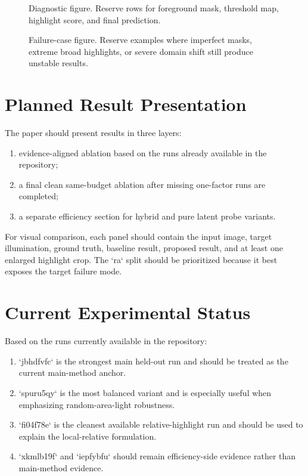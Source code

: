\documentclass[UTF8,a4paper]{ctexart}
\begin{document}
\begin{figure}[htbp]
\centering
\fbox{\rule{0pt}{4.6cm}\rule{0.92\linewidth}{0pt}}
\caption{Diagnostic figure. Reserve rows for foreground mask, threshold map, highlight score, and final prediction.}
\end{figure}

\begin{figure}[htbp]
\centering
\fbox{\rule{0pt}{4.5cm}\rule{0.92\linewidth}{0pt}}
\caption{Failure-case figure. Reserve examples where imperfect masks, extreme broad highlights, or severe domain shift still produce unstable results.}
\end{figure}

\section{Planned Result Presentation}

The paper should present results in three layers:

\begin{enumerate}
\item evidence-aligned ablation based on the runs already available in the repository;
\item a final clean same-budget ablation after missing one-factor runs are completed;
\item a separate efficiency section for hybrid and pure latent probe variants.
\end{enumerate}

For visual comparison, each panel should contain the input image, target illumination, ground truth, baseline result, proposed result, and at least one enlarged highlight crop. The `ra` split should be prioritized because it best exposes the target failure mode.

\section{Current Experimental Status}

Based on the runs currently available in the repository:

\begin{enumerate}
\item `jbhdfvfc` is the strongest main held-out run and should be treated as the current main-method anchor.
\item `spuru5qy` is the most balanced variant and is especially useful when emphasizing random-area-light robustness.
\item `fi04f78e` is the cleanest available relative-highlight run and should be used to explain the local-relative formulation.
\item `xkmlb19f` and `iepfybfu` should remain efficiency-side evidence rather than main-method evidence.
\end{enumerate}
\end{document}
